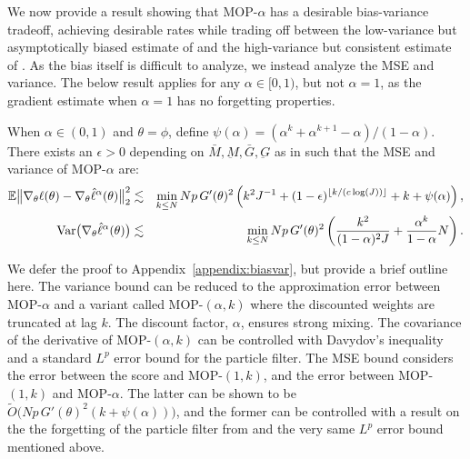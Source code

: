 \documentclass[11pt]{article}
\newcommand\arxiv[2]{#1} %
\begin{document}
We now provide a result showing that MOP-$\alpha$ has a desirable bias-variance tradeoff, achieving desirable rates while trading off between the low-variance but asymptotically biased estimate of \cite{naesseth18} and the high-variance but consistent estimate of \cite{poyiadjis11}. As the bias itself is difficult to analyze, we instead analyze the MSE and variance. The below result applies for any $\alpha \in [0,1)$, but not $\alpha=1$, as the gradient estimate when $\alpha=1$ has no forgetting properties. 

\begin{thm}
    \label{thm:mop-biasvar}
    When $\alpha\in (0,1)$ and $\theta=\phi$, define $\psi(\alpha)=(\alpha^k  + \alpha^{k+1} - \alpha)/(1-\alpha)$. 
    There exists an $\epsilon>0$ depending on $\bar{M}, \underbar{M}, \bar{G}, \underbar{G}$ as in \cite{karjalainen23} such that the MSE and variance of MOP-$\alpha$ are:
    \vspace*{-1ex}
    \begin{eqnarray}
        \mathbb{E}\big\|\nabla_\theta\ell(\theta) - \nabla_\theta \hat\ell^\alpha(\theta)\big\|_2^2 
        &\lesssim& \min_{k \leq N} Np \, G'(\theta)^2\left(k^2J^{-1}+(1-\epsilon)^{\lfloor k/(c\log(J)) \rfloor}+k+\psi(\alpha)\right), \label{eq:mop-mse}
        \\
        \mathrm{Var}\big(\nabla_\theta \hat\ell^{\alpha}(\theta)\big) &\lesssim& \min_{k\leq N} Np \, G'(\theta)^2\left(\frac{k^2}{(1-\alpha)^2J} + \frac{\alpha^{k}}{1-\alpha}N\right). \label{eq:mop-variance}
        \end{eqnarray}
\end{thm}
We defer the proof to \arxiv{Appendix~\ref{appendix:biasvar}}{the supplementary material}, but provide a brief outline here. 
The variance bound can be reduced to the approximation error between MOP-$\alpha$ and a variant called MOP-$(\alpha,k)$ where the discounted weights are truncated at lag $k$. 
The discount factor, $\alpha$, ensures strong mixing.
The covariance of the derivative of MOP-$(\alpha,k)$ can be controlled with Davydov's inequality and a standard $L^p$ error bound for the particle filter. 
The MSE bound considers the error between the score and MOP-$(1,k)$, and the error between MOP-$(1,k)$ and MOP-$\alpha$. 
The latter can be shown to be $\tilde{O}\big(Np \, G'(\theta)^2(k+\psi(\alpha))\big)$, and the former can be controlled with a result on the the forgetting of the particle filter from \cite{karjalainen23} and the very same $L^p$ error bound mentioned above. 
\end{document}
